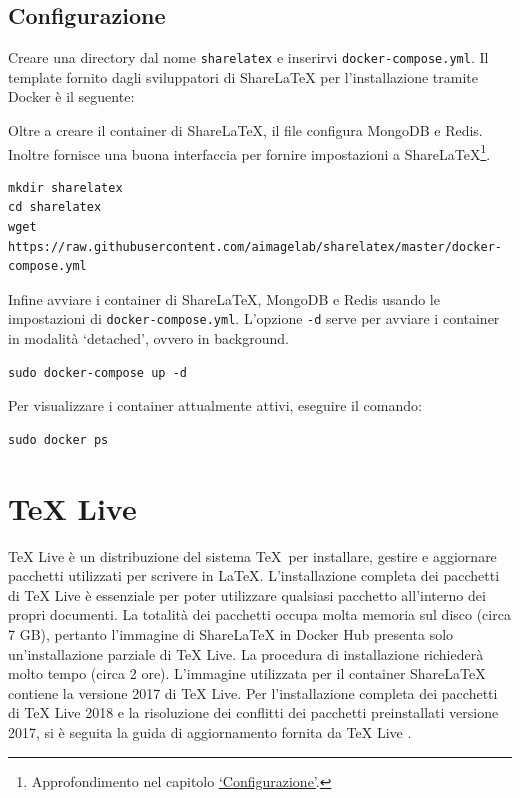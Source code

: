 \subsection{Configurazione}
Creare una directory dal nome \verb|sharelatex| e inserirvi \verb|docker-compose.yml|. Il template fornito dagli sviluppatori di ShareLaTeX per l'installazione tramite Docker è il seguente:

Oltre a creare il container di ShareLaTeX, il file configura MongoDB e Redis. Inoltre fornisce una buona interfaccia per fornire impostazioni a ShareLaTeX\footnote{Approfondimento nel capitolo \hyperref[Configurazione]{\enquote*{Configurazione}}.}.
\begin{lstlisting}
mkdir sharelatex
cd sharelatex
wget https://raw.githubusercontent.com/aimagelab/sharelatex/master/docker-compose.yml
\end{lstlisting}
Infine avviare i container di ShareLaTeX, MongoDB e Redis usando le impostazioni di \verb|docker-compose.yml|. L'opzione \verb|-d| serve per avviare i container in modalità \enquote*{detached}, ovvero in background.
\begin{lstlisting}
sudo docker-compose up -d
\end{lstlisting}
Per visualizzare i container attualmente attivi, eseguire il comando:
\begin{lstlisting}
sudo docker ps
\end{lstlisting}

\section{TeX Live}
TeX Live \cite{texlive} è un distribuzione del sistema \TeX ~per installare, gestire e aggiornare pacchetti utilizzati per scrivere in \LaTeX. L'installazione completa dei pacchetti di TeX Live è essenziale per poter utilizzare qualsiasi pacchetto all'interno dei propri documenti. La totalità dei pacchetti occupa molta memoria sul disco (circa 7 GB), pertanto l'immagine di ShareLaTeX in Docker Hub presenta solo un'installazione parziale di TeX Live. La procedura di installazione richiederà molto tempo (circa 2 ore). L'immagine utilizzata per il container ShareLaTeX contiene la versione 2017 di TeX Live. Per l'installazione completa dei pacchetti di TeX Live 2018 e la risoluzione dei conflitti dei pacchetti preinstallati versione 2017, si è seguita la guida di aggiornamento fornita da TeX Live \cite{texlive_upgrade}.

